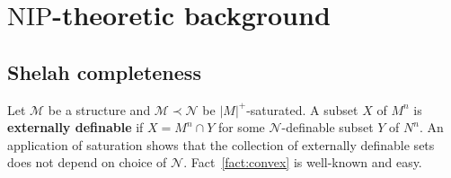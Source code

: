 \documentclass[bibalpha]{amsart}
\newtheorem{lemma}[theorem]{Lemma}
\theoremstyle{definition}
\theoremstyle{remark}
\newcommand{\cl}{\operatorname{Cl}}
\newcommand{\nip}{\mathrm{NIP}}
\newcommand{\Cal}[1]{\ensuremath{\mathcal{#1}}}
\newcommand{\Sa}[1]{\ensuremath{\mathscr{#1}}}
\newcommand{\R}{\mathbb{R}}
\begin{document}

\begin{comment}
\noindent We first record an easy lemma.
A family $\Cal X$ of sets is \textbf{upwards directed} if for all $X,X' \in \Cal X$ there is $Y \in \Cal X$ such that $X,X' \subseteq Y$ and \textbf{downwards directed} if for all $X,X' \in \Cal X$ there is $Y \in \Cal X$ such that $Y \subseteq X,X'$.

\begin{lemma}
\label{lemma:directed}
Let $\Sa M$ be a structure, $\phi(x,y)$ be a formula, and $A \subseteq M^x$..
If $\{ \phi(a,M^y) : a \in M^x \}$ is upwards directed then $\bigcup_{a \in M^x} \phi(a,M^y)$ is externally definable.
If $\{ \phi(a,M^y) : a \in M^x \}$ is downwards directed then $\bigcap_{a \in M^x} \phi(a,M^y)$ is externally definable.
\end{lemma}

\begin{proof}
We only treat the case when $\{ \phi(a,M^y) : a \in M^x \}$ is upwards directed, the downward case is similar.
Let $O := \bigcup_{a \in M^x} \phi(a,M^y)$.
It suffices to show that 
$$ p(x) := \{ \forall y ( \phi(a,y) \to \phi(x,y) ) : a \in A \} \cup \{ \neg \phi(x,b) : b \notin O \} $$
is a consistent type.
Suppose $A' \subseteq A$ is finite.
Applying upwards directedness there is $c \in A$ such that $\bigcup_{a \in A'} \phi(a,M^y) \subseteq \phi(c,M^y)$.
So
$$ \Sa M \models \{ \forall y ( \phi(a,y) \to \phi(c,y) ) : a \in A' \} \cup \{ \neg \phi(c,b) : b \notin O \}. $$
\end{proof}
\end{comment}

\section{$\nip$-theoretic background}
\subsection{Shelah completeness}
Let $\Sa M$ be a structure and $\Sa M \prec \Sa N$ be $|M|^+$-saturated.
A subset $X$ of $M^n$ is \textbf{externally definable} if $X = M^n \cap Y$ for some $\Sa N$-definable subset $Y$ of $N^n$.
An application of saturation shows that the collection of externally definable sets does not depend on choice of $\Sa N$.
Fact~\ref{fact:convex} is well-known and easy.
\end{document}
